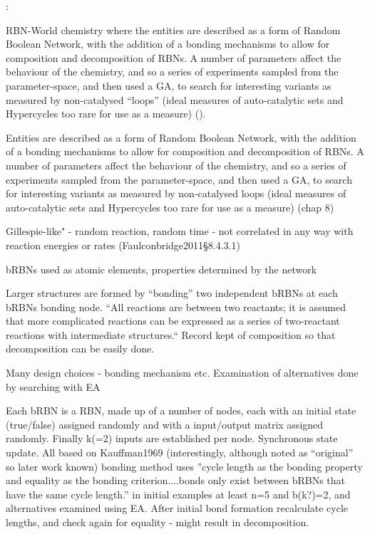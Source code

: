 \autocite{Faulconbridge2010, Faulconbridge2011}:

RBN-World \cite{Faulconbridge2011} chemistry where the entities are described as a form of Random Boolean Network, with the addition of a bonding mechanisms to allow for composition and decomposition of RBNs. A number of parameters affect the behaviour of the chemistry, and so a series of experiments sampled from the parameter-space, and then used a GA, to search for interesting variants as measured by non-catalysed ``loops'' (ideal measures of auto-catalytic sets and Hypercycles too rare for use as a measure) (\cite[§8]{Faulconbridge2011}). 

Entities are described as a form of Random Boolean Network, with the addition of a bonding mechanisms to allow for composition and decomposition of RBNs. A number of parameters affect the behaviour of the chemistry, and so a series of experiments sampled from the parameter-space, and then used a GA, to search for interesting variants as measured by non-catalysed loops (ideal measures of auto-catalytic sets and Hypercycles too rare for use as a measure) (chap 8)

Gillespie-like" - random reaction, random time - not correlated in any way with reaction energies or rates (Faulconbridge2011§8.4.3.1)

bRBNs used as atomic elements, properties determined by the network

Larger structures are formed by ``bonding'' two independent bRBNs at each bRBNs bonding node. ``All reactions are between two reactants; it is assumed that more complicated reactions can be expressed as a series of two-reactant reactions with intermediate structures.`` Record kept of composition so that decomposition can be easily done.

Many design choices - bonding mechanism etc. Examination of alternatives done by searching with EA

Each bRBN is a RBN, made up of a number of nodes, each with an initial state (true/false) assigned randomly and with a input/output matrix assigned randomly. Finally k(=2) inputs are established per node. Synchronous state update. All based on Kauffman1969 (interestingly, although noted as ``original'' so later work known) bonding method uses ''cycle length as the bonding property and equality as the bonding criterion....bonds only exist between bRBNs that have the same cycle length.'' in initial examples at least n=5 and b(k?)=2, and alternatives examined using EA. After initial bond formation recalculate cycle lengths, and check again for equality - might result in decomposition.

